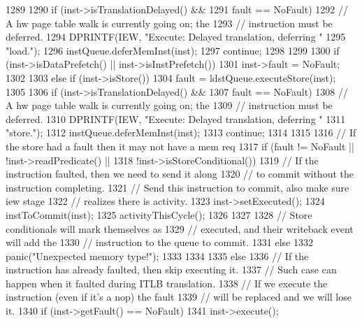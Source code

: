 \begin{DoxyCode}
{{{{1289 
1290                 if (inst->isTranslationDelayed() &&
1291                     fault == NoFault) {
1292                     // A hw page table walk is currently going on; the
1293                     // instruction must be deferred.
1294                     DPRINTF(IEW, "Execute: Delayed translation, deferring "
1295                             "load.\n");
1296                     instQueue.deferMemInst(inst);
1297                     continue;
1298                 }
1299 
1300                 if (inst->isDataPrefetch() || inst->isInstPrefetch()) {
1301                     inst->fault = NoFault;
1302                 }
1303             } else if (inst->isStore()) {
1304                 fault = ldstQueue.executeStore(inst);
1305 
1306                 if (inst->isTranslationDelayed() &&
1307                     fault == NoFault) {
1308                     // A hw page table walk is currently going on; the
1309                     // instruction must be deferred.
1310                     DPRINTF(IEW, "Execute: Delayed translation, deferring "
1311                             "store.\n");
1312                     instQueue.deferMemInst(inst);
1313                     continue;
1314                 }
1315 
1316                 // If the store had a fault then it may not have a mem req
1317                 if (fault != NoFault || !inst->readPredicate() ||
1318                         !inst->isStoreConditional()) {
1319                     // If the instruction faulted, then we need to send it along
1320                     // to commit without the instruction completing.
1321                     // Send this instruction to commit, also make sure iew stage
1322                     // realizes there is activity.
1323                     inst->setExecuted();
1324                     instToCommit(inst);
1325                     activityThisCycle();
1326                 }
1327 
1328                 // Store conditionals will mark themselves as
1329                 // executed, and their writeback event will add the
1330                 // instruction to the queue to commit.
1331             } else {
1332                 panic("Unexpected memory type!\n");
1333             }
1334 
1335         } else {
1336             // If the instruction has already faulted, then skip executing it.
1337             // Such case can happen when it faulted during ITLB translation.
1338             // If we execute the instruction (even if it's a nop) the fault
1339             // will be replaced and we will lose it.
1340             if (inst->getFault() == NoFault) {
1341                 inst->execute();
}}}}
\end{DoxyCode}
